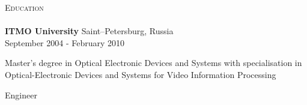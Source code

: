 \documentclass[a4paper]{article}
\newcommand{\lineunder} {
    \vspace*{-8pt} \\
    \hspace*{-18pt} \hrulefill \\
}
\newcommand{\header} [1] {
        {\hspace*{-18pt}\vspace*{6pt} \textsc{#1}}
    \vspace*{-6pt} \lineunder
}
\newcommand{\education} [5] {
    \textbf{#1} \hfill {#4} \\ {#5}
    \begin{description}[leftmargin=13mm,labelindent=0mm,itemsep=-1mm]
        \item[Degree:] {#2}
        \item[Qualification:] {#3}
    \end{description}
    \vspace{2mm}
}
\newcommand{\project} [4] {
    \textbf{#1} \hfill {#4} \\ \vspace{1mm}
    \begin{addmargin}[1em]{1em}
        \begin{description}[leftmargin=2cm,labelindent=0mm,itemsep=-1mm]
            \item[Tools:] {#2}
            \item[Description:] {#3}
        \end{description}
    \end{addmargin}
    \vspace{2mm}
}
\begin{document}
    \header{Education}

    \education{ITMO University}
    {Master’s degree in Optical Electronic Devices and Systems with specialisation in Optical-Electronic Devices and Systems for Video Information Processing}
    {Engineer}
    {Saint–Petersburg, Russia}
    {September 2004 - February 2010}


%
%
\end{document}
